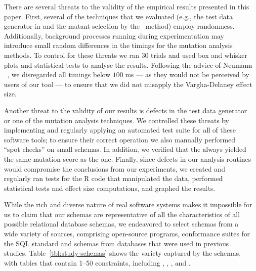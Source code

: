 

 There are several threats to the validity of the empirical results presented in this paper. First, several of the techniques that we evaluated (e.g., the test data generator in \SA and the mutant selection by the \tcm~method) employ randomness. Additionally, background processes running during experimentation may introduce small random differences in the timings for the mutation analysis methods. To control for these threats we ran 30 trials and used box and whisker plots and statistical tests to analyse the results. Following the advice of Neumann \etal~\cite{Neumann2015}, we disregarded all timings below $100$ ms --- as they would not be perceived by users of our tool --- to ensure that we did not misapply the Vargha-Delaney effect size.



Another threat to the validity of our results is defects in the test data generator or one of the mutation analysis techniques. We controlled these threats by implementing and regularly applying an automated test suite for all of these software tools; to ensure their correct operation we also manually performed ``spot checks'' on small schemas. In addition, we verified that the \vma always yielded the same mutation score as the \Original one. Finally, since defects in our analysis routines would compromise the conclusions from our experiments, we created and regularly ran tests for the R code that manipulated the data, performed statistical tests and effect size computations, and graphed the results.


While the rich and diverse nature of real software systems makes it impossible for us to claim that our schemas are representative of all the characteristics of all possible relational database schemas, we endeavored to select schemas from a wide variety of sources, comprising open-source programs, conformance suites for the SQL standard and schemas from databases that were used in previous studies. Table~\ref{tbl:study-schemas} shows the variety captured by the schemas, with tables that contain 1--50 constraints, including \CHECKs, \FKs, \PKs, \NOTNULLs and \UNIQUEs.
